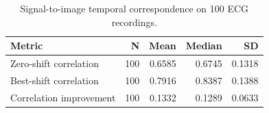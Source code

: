 \begin{table}[t]
\caption{Signal-to-image temporal correspondence on 100 ECG recordings.}
\label{tab:08_temporal_validation}
\begin{tabular}{lrrrr}
\toprule
Metric & N & Mean & Median & SD \\
\midrule
Zero-shift correlation & 100 & 0.6585 & 0.6745 & 0.1318 \\
Best-shift correlation & 100 & 0.7916 & 0.8387 & 0.1388 \\
Correlation improvement & 100 & 0.1332 & 0.1289 & 0.0633 \\
\bottomrule
\end{tabular}
\end{table}
